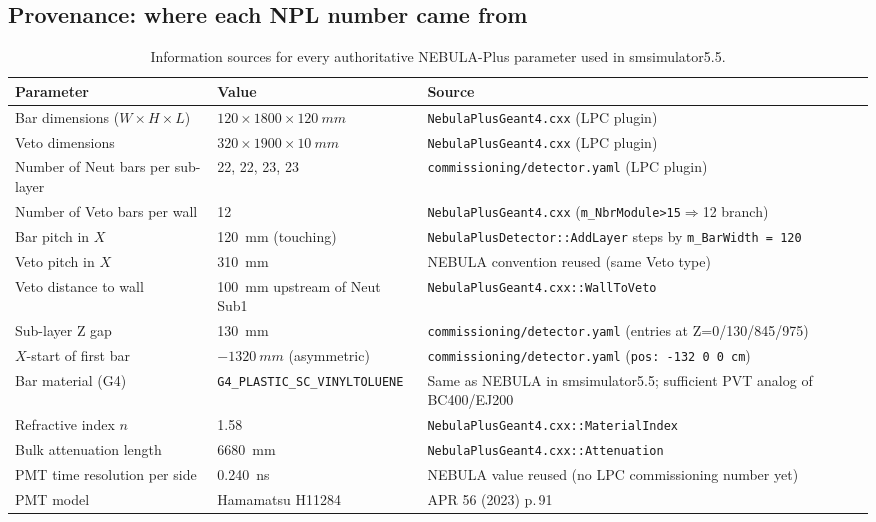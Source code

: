 \documentclass[11pt,a4paper]{article}
\newcommand{\NEB}{NEBULA}
\newcommand{\NPL}{NEBULA-Plus}
\begin{document}
\begin{CJK}{UTF8}{gbsn}
\section{Provenance: where each NPL number came from}
\label{sec:provenance}

\begin{table}[h]
\centering
\caption{Information sources for every authoritative \NPL{} parameter used
in smsimulator5.5.}
\begin{tabular}{p{4.8cm}lp{6.5cm}}
\toprule
Parameter & Value & Source\\
\midrule
Bar dimensions ($W\times H\times L$)
  & $120\times 1800\times \SI{120}{mm}$
  & \texttt{NebulaPlusGeant4.cxx} (LPC plugin)\\
Veto dimensions
  & $320\times 1900\times \SI{10}{mm}$
  & \texttt{NebulaPlusGeant4.cxx} (LPC plugin)\\
Number of Neut bars per sub-layer
  & 22, 22, 23, 23
  & \texttt{commissioning/detector.yaml} (LPC plugin)\\
Number of Veto bars per wall
  & 12
  & \texttt{NebulaPlusGeant4.cxx} (\texttt{m\_NbrModule>15}$\Rightarrow$12 branch)\\
Bar pitch in $X$
  & \SI{120}{mm} (touching)
  & \texttt{NebulaPlusDetector::AddLayer} steps by \texttt{m\_BarWidth = 120}\\
Veto pitch in $X$
  & \SI{310}{mm}
  & NEBULA convention reused (same Veto type)\\
Veto distance to wall
  & \SI{100}{mm} upstream of Neut Sub1
  & \texttt{NebulaPlusGeant4.cxx::WallToVeto}\\
Sub-layer Z gap
  & \SI{130}{mm}
  & \texttt{commissioning/detector.yaml} (entries at Z=0/130/845/975)\\
$X$-start of first bar
  & $-\SI{1320}{mm}$ (asymmetric)
  & \texttt{commissioning/detector.yaml} (\texttt{pos: -132 0 0 cm})\\
Bar material (G4)
  & \texttt{G4\_PLASTIC\_SC\_VINYLTOLUENE}
  & Same as \NEB{} in smsimulator5.5; sufficient PVT analog of BC400/EJ200\\
Refractive index $n$
  & 1.58
  & \texttt{NebulaPlusGeant4.cxx::MaterialIndex}\\
Bulk attenuation length
  & \SI{6680}{mm}
  & \texttt{NebulaPlusGeant4.cxx::Attenuation}\\
PMT time resolution per side
  & \SI{0.240}{ns}
  & NEBULA value reused (no LPC commissioning number yet)\\
PMT model
  & Hamamatsu H11284
  & APR 56 (2023) p.\,91~\cite{aprApr2022}\\

\end{tabular}
\end{table}
\end{CJK}
\end{document}
